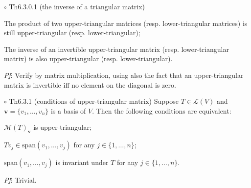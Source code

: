 \documentclass{article}
\begin{document}
\begin{Th}{$\circ$ Th6.3.0.1 (the inverse of a triangular matrix)}
    \begin{compactenum}
        \item The product of two upper-triangular matrices (resp. lower-triangular matrices) is still upper-triangular (resp. lower-triangular);
        \item The inverse of an invertible upper-triangular matrix (resp. lower-triangular matrix) is also upper-triangular (resp. lower-triangular).
    \end{compactenum}
    \tcblower
    \textit{Pf}: Verify by matrix multiplication, using also the fact that \textcolor{Th}{an upper-triangular matrix is invertible iff no element on the diagonal is zero.}
\end{Th}

\begin{Th}{$\circ$ Th6.3.1 (conditions of upper-triangular matrix)}
    Suppose $T\in\mathcal{L}(V)$ and $\pmb{v} = \{v_1, \dots, v_n\}$ is a basis of $V$. Then the following conditions are equivalent:
    \begin{compactenum}
        \item $\mathcal{M}(T)_{\pmb{v}}$ is upper-triangular;
        \item $Tv_j\in \text{span}(v_1, \dots, v_j)$ for any $j\in\{1, \dots, n\}$;
        \item $\text{span}(v_1, \dots, v_j)$ is invariant under $T$ for any $j\in\{1, \dots, n\}$.
    \end{compactenum}
    \tcblower
    \textit{Pf}: Trivial.
\end{Th}
\end{document}
